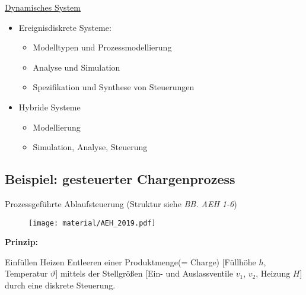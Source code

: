 \underline{Dynamisches System}

\begin{figure}[H]
	\centering
\end{figure}


\begin{itemize}
	\item Ereignisdiskrete Systeme: 
	\begin{itemize}
		\item Modelltypen und Prozessmodellierung
		\item Analyse und Simulation
		\item Spezifikation und Synthese von Steuerungen
	\end{itemize}
	\item Hybride Systeme
	\begin{itemize}
		\item Modellierung
		\item Simulation, Analyse, Steuerung
	\end{itemize} 
\end{itemize}


\subsection{Beispiel: gesteuerter Chargenprozess}
Prozessgeführte Ablaufsteuerung (Struktur siehe \textit{BB. AEH 1-6})

\begin{figure}[H]
	\centering
	\texttt{[image: material/AEH\_2019.pdf]}
\end{figure}


\textbf{Prinzip: }

Einfüllen \textrightarrow Heizen \textrightarrow Entleeren einer Produktmenge(= Charge) [Füllhöhe $h$, Temperatur $\vartheta$] mittels der Stellgrößen [Ein- und Auslassventile $v_1$, $v_2$, Heizung $H$] durch eine diskrete Steuerung.